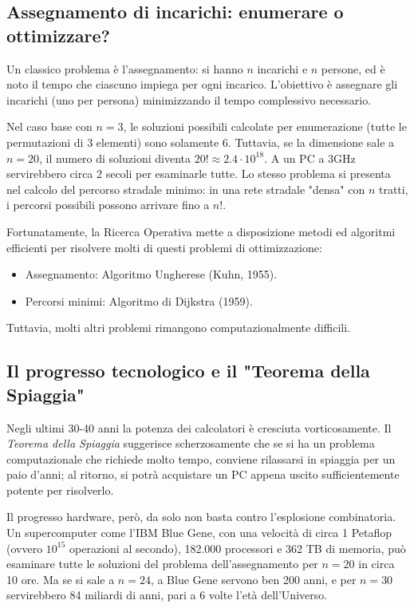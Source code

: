 \documentclass[12pt]{extarticle} %
\begin{document}
\subsection{Assegnamento di incarichi: enumerare o ottimizzare?}
Un classico problema è l'assegnamento: si hanno $n$ incarichi e $n$ persone, ed è noto il tempo che ciascuno impiega per ogni incarico. L'obiettivo è assegnare gli incarichi (uno per persona) minimizzando il tempo complessivo necessario.

Nel caso base con $n=3$, le soluzioni possibili calcolate per enumerazione (tutte le permutazioni di 3 elementi) sono solamente 6.
Tuttavia, se la dimensione sale a $n=20$, il numero di soluzioni diventa $20! \approx 2.4 \cdot 10^{18}$. A un PC a 3GHz servirebbero circa 2 secoli per esaminarle tutte.
Lo stesso problema si presenta nel calcolo del percorso stradale minimo: in una rete stradale "densa" con $n$ tratti, i percorsi possibili possono arrivare fino a $n!$.

Fortunatamente, la Ricerca Operativa mette a disposizione metodi ed algoritmi efficienti per risolvere molti di questi problemi di ottimizzazione:
\begin{itemize}
    \item Assegnamento: Algoritmo Ungherese (Kuhn, 1955).
    \item Percorsi minimi: Algoritmo di Dijkstra (1959).
\end{itemize}
Tuttavia, molti altri problemi rimangono computazionalmente difficili.

\subsection{Il progresso tecnologico e il "Teorema della Spiaggia"}
Negli ultimi 30-40 anni la potenza dei calcolatori è cresciuta vorticosamente. Il \textit{Teorema della Spiaggia} suggerisce scherzosamente che se si ha un problema computazionale che richiede molto tempo, conviene rilassarsi in spiaggia per un paio d'anni; al ritorno, si potrà acquistare un PC appena uscito sufficientemente potente per risolverlo.

Il progresso hardware, però, da solo non basta contro l'esplosione combinatoria. Un supercomputer come l'IBM Blue Gene, con una velocità di circa 1 Petaflop (ovvero $10^{15}$ operazioni al secondo), 182.000 processori e 362 TB di memoria, può esaminare tutte le soluzioni del problema dell'assegnamento per $n=20$ in circa 10 ore. Ma se si sale a $n=24$, a Blue Gene servono ben 200 anni, e per $n=30$ servirebbero 84 miliardi di anni, pari a 6 volte l'età dell'Universo.
\end{document}
